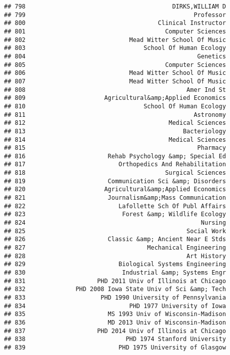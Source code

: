 \documentclass[
]{article}
\begin{document}
\begin{verbatim}
## 798                                         DIRKS,WILLIAM D
## 799                                               Professor
## 800                                     Clinical Instructor
## 801                                       Computer Sciences
## 802                             Mead Witter School Of Music
## 803                                 School Of Human Ecology
## 804                                                Genetics
## 805                                       Computer Sciences
## 806                             Mead Witter School Of Music
## 807                             Mead Witter School Of Music
## 808                                             Amer Ind St
## 809                      Agricultural&amp;Applied Economics
## 810                                 School Of Human Ecology
## 811                                               Astronomy
## 812                                        Medical Sciences
## 813                                            Bacteriology
## 814                                        Medical Sciences
## 815                                                Pharmacy
## 816                       Rehab Psychology &amp; Special Ed
## 817                          Orthopedics And Rehabilitation
## 818                                       Surgical Sciences
## 819                       Communication Sci &amp; Disorders
## 820                      Agricultural&amp;Applied Economics
## 821                       Journalism&amp;Mass Communication
## 822                          Lafollette Sch Of Publ Affairs
## 823                           Forest &amp; Wildlife Ecology
## 824                                                 Nursing
## 825                                             Social Work
## 826                       Classic &amp; Ancient Near E Stds
## 827                                  Mechanical Engineering
## 828                                             Art History
## 829                          Biological Systems Engineering
## 830                           Industrial &amp; Systems Engr
## 831                    PHD 2011 Univ of Illinois at Chicago
## 832              PHD 2008 Iowa State Univ of Sci &amp; Tech
## 833                     PHD 1990 University of Pennsylvania
## 834                             PHD 1977 University of Iowa
## 835                       MS 1993 Univ of Wisconsin-Madison
## 836                       MD 2013 Univ of Wisconsin-Madison
## 837                    PHD 2014 Univ of Illinois at Chicago
## 838                            PHD 1974 Stanford University
## 839                          PHD 1975 University of Glasgow

\end{verbatim}
\end{document}
